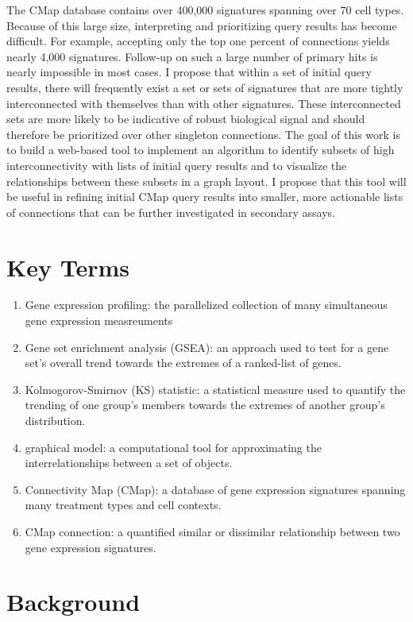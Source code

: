 \documentclass[12pt]{article}
\begin{document}
The CMap database contains over 400,000 signatures spanning over 70 cell types. Because of this large size, interpreting and prioritizing query results has become difficult. For example, accepting only the top one percent of connections yields nearly 4,000 signatures. Follow-up on such a large number of primary hits is nearly impossible in most cases. I propose that within a set of initial query results, there will frequently exist a set or sets of signatures that are more tightly interconnected with themselves than with other signatures. These interconnected sets are more likely to be indicative of robust biological signal and should therefore be prioritized over other singleton connections. The goal of this work is to build a web-based tool to implement an algorithm to identify subsets of high interconnectivity with lists of initial query results and to visualize the relationships between these subsets in a graph layout. I propose that this tool will be useful in refining initial CMap query results into smaller, more actionable lists of connections that can be further investigated in secondary assays.

\section{Key Terms}
\begin{enumerate}
\item Gene expression profiling: the parallelized collection of many simultaneous gene expression measreuments
\item Gene set enrichment analysis (GSEA): an approach used to test for a gene set's overall trend towards the extremes of a ranked-list of genes.
\item Kolmogorov-Smirnov (KS) statistic: a statistical measure used to quantify the trending of one group's members towards the extremes of another group's distribution.
\item graphical model: a computational tool for approximating the interrelationships between a set of objects.
\item Connectivity Map (CMap): a database of gene expression signatures spanning many treatment types and cell contexts.
\item CMap connection: a quantified similar or dissimilar relationship between two gene expression signatures.
\end{enumerate}

\section{Background}
\end{document}

